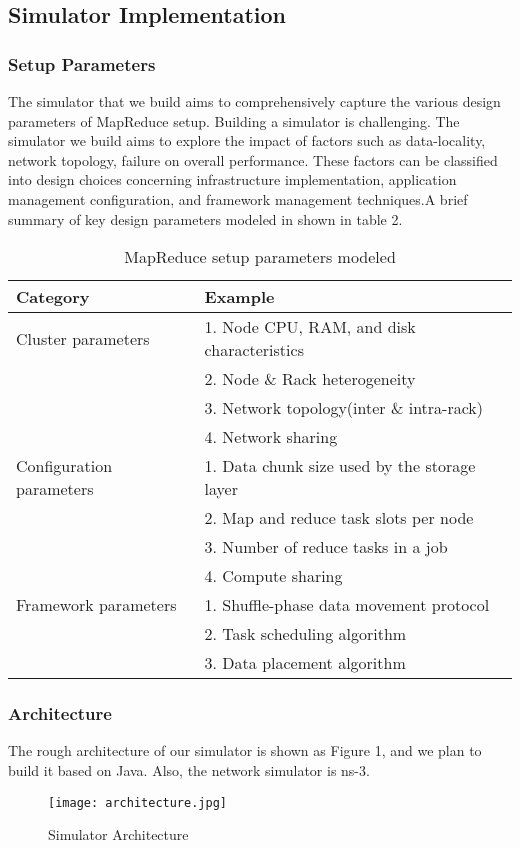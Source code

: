 \documentclass{Project}
\begin{document}
\subsection{Simulator Implementation}
\subsubsection{Setup Parameters}
The simulator that we build aims to comprehensively capture the various design parameters of MapReduce setup. Building a simulator is challenging. The simulator we build aims to explore the impact of factors such as data-locality, network topology, failure on overall performance. These factors can be classified into design choices concerning infrastructure implementation, application management configuration, and framework management techniques.A brief summary of key design parameters modeled in shown in table 2.
\begin{table}
\caption{MapReduce setup parameters modeled}
\begin{tabular}{p{}|p{}}
 \hline
      Category           &                  Example \\ \hline
Cluster parameters       & 1. Node CPU, RAM, and disk characteristics \\ 
                         & 2. Node \& Rack heterogeneity \\
                         & 3. Network topology(inter \& intra-rack) \\
                         & 4. Network sharing \\ \hline
Configuration parameters & 1. Data chunk size used by the storage layer \\ 
                         & 2. Map and reduce task slots per node \\
                         & 3. Number of reduce tasks in a job \\
                         & 4. Compute sharing \\ \hline
Framework parameters     & 1. Shuffle-phase data movement protocol \\
                         & 2. Task scheduling algorithm \\ 
                         & 3. Data placement algorithm \\ \hline
\end{tabular}
\end{table}\par

\subsubsection{Architecture}
The rough architecture of our simulator is shown as Figure 1, and we plan to build it based on Java. Also, the network simulator is ns-3.
\begin{figure}[!htb]
\centering
\caption{Simulator Architecture}
\texttt{[image: architecture.jpg]}
\label{fig:graph}
\end{figure}
\end{document}
